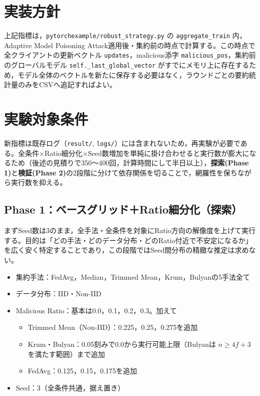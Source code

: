 \documentclass[a4j, twocolumn, dvipdfmx]{jsarticle}
\begin{document}
\section{実装方針}

上記指標は，\texttt{pytorchexample/robust\_strategy.py} の \texttt{aggregate\_train} 内，Adaptive Model Poisoning Attack適用後・集約前の時点で計算する。この時点で全クライアントの更新ベクトル \texttt{updates}，malicious添字 \texttt{malicious\_pos}，集約前のグローバルモデル \texttt{self.\_last\_global\_vector} がすでにメモリ上に存在するため，モデル全体のベクトルを新たに保存する必要はなく，ラウンドごとの要約統計量のみをCSVへ追記すればよい。

\section{実験対象条件}

新指標は既存ログ（\texttt{result/}, \texttt{logs/}）には含まれないため，再実験が必要である。全条件×Ratio細分化×Seed数増加を単純に掛け合わせると実行数が膨大になるため（後述の見積りで350〜400回，計算時間にして半日以上），\textbf{探索(Phase 1)}と\textbf{検証(Phase 2)}の2段階に分けて依存関係を切ることで，網羅性を保ちながら実行数を抑える。

\subsection{Phase 1：ベースグリッド＋Ratio細分化（探索）}

まずSeed数は3のまま，全手法・全条件を対象にRatio方向の解像度を上げて実行する。目的は「どの手法・どのデータ分布・どのRatio付近で不安定になるか」を広く安く特定することであり，この段階ではSeed間分布の精緻な推定は求めない。

\begin{itemize}
  \item 集約手法：FedAvg，Median，Trimmed Mean，Krum，Bulyanの5手法全て
  \item データ分布：IID・Non-IID
  \item Malicious Ratio：基本は0.0，0.1，0.2，0.3。加えて
    \begin{itemize}
      \item Trimmed Mean（Non-IID）：0.225，0.25，0.275を追加
      \item Krum・Bulyan：0.05刻みで0.0から実行可能上限（Bulyanは $n \geq 4f+3$ を満たす範囲）まで追加
      \item FedAvg：0.125，0.15，0.175を追加
    \end{itemize}
  \item Seed：3（全条件共通，据え置き）
\end{itemize}
\end{document}
